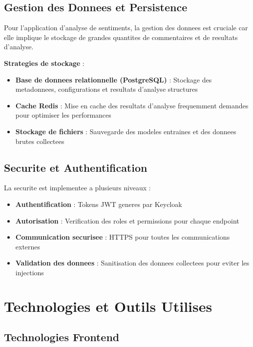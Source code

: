 \subsection{Gestion des Donnees et Persistence}

Pour l'application d'analyse de sentiments, la gestion des donnees est cruciale car elle implique le stockage de grandes quantites de commentaires et de resultats d'analyse.

\textbf{Strategies de stockage} :
\begin{itemize}
    \item \textbf{Base de donnees relationnelle (PostgreSQL)} : Stockage des metadonnees, configurations et resultats d'analyse structures
    \item \textbf{Cache Redis} : Mise en cache des resultats d'analyse frequemment demandes pour optimiser les performances
    \item \textbf{Stockage de fichiers} : Sauvegarde des modeles entraines et des donnees brutes collectees
\end{itemize}

\subsection{Securite et Authentification}

La securite est implementee a plusieurs niveaux :

\begin{itemize}
    \item \textbf{Authentification} : Tokens JWT generes par Keycloak
    \item \textbf{Autorisation} : Verification des roles et permissions pour chaque endpoint
    \item \textbf{Communication securisee} : HTTPS pour toutes les communications externes
    \item \textbf{Validation des donnees} : Sanitisation des donnees collectees pour eviter les injections
\end{itemize}

\section{Technologies et Outils Utilises}

\subsection{Technologies Frontend}


